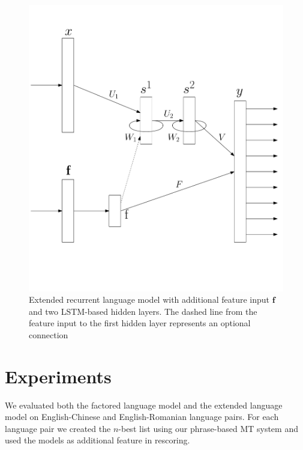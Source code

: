 \documentclass[a4paper]{article}
\begin{document}
\begin{figure} 
\centering 
\includegraphics[width=\columnwidth]{ModelExtended2.pdf}
\caption{Extended recurrent language model with additional feature input $\textbf{f}$ and two LSTM-based hidden layers. The dashed line from the feature input to the first hidden layer represents an optional connection}
\label{fig:model-extended}
\end{figure}


\section{Experiments}
We evaluated both the factored language model and the extended language model on English-Chinese and English-Romanian language pairs. For each language pair we created the $n$-best list using our phrase-based MT system and used the models as additional feature in rescoring.
\end{document}
